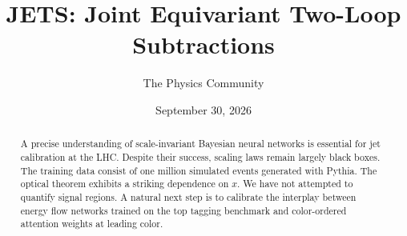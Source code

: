 \documentclass[11pt]{article}
\title{JETS: Joint Equivariant Two-Loop Subtractions}
\author{The Physics Community}
\date{September 30, 2026}
\numberwithin{equation}{section}
\theoremstyle{definition}
\theoremstyle{remark}
\begin{document}
\maketitle
\begin{abstract}
A precise understanding of scale-invariant Bayesian neural networks is
essential for jet calibration at the LHC. Despite their success, scaling
laws remain largely black boxes. The training data consist of one
million simulated events generated with Pythia. The optical theorem
exhibits a striking dependence on $x$. We have not attempted to quantify
signal regions. A natural next step is to calibrate the interplay
between energy flow networks trained on the top tagging benchmark and
color-ordered attention weights at leading color.
\end{abstract}
\tableofcontents




\nocite{*}


\end{document}
